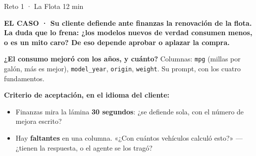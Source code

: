 \documentclass[aspectratio=169, 11pt]{beamer}
\begin{document}
\begin{frame}[shrink=8]{\faTools\hspace{4pt}Reto 1 · La Flota \hfill {\normalsize\color{arcaRed}\faClock\hspace{4pt}12 min}}
  \vspace{-4pt}
  \begin{tcolorbox}[colback=arcaGray, colframe=arcaRed, boxrule=0pt,
    leftrule=3pt, arc=3pt, left=7pt, right=7pt, top=2pt, bottom=2pt]
    {\scriptsize\color{arcaRed}\bfseries EL CASO ·
     \color{textMuted}\mdseries
     Su cliente defiende ante finanzas la \textbf{renovación de la flota}.
     La duda que lo frena: ¿los modelos nuevos de verdad consumen menos, o
     es un mito caro? De eso depende \textbf{aprobar o aplazar} la compra.}
  \end{tcolorbox}
  \vspace{2pt}
  \begin{encargo}
    {\scriptsize\color{textMuted}
     \textbf{¿El consumo mejoró con los años, y cuánto?} Columnas:
     \texttt{mpg} (millas por galón, más es mejor), \texttt{model\_year},
     \texttt{origin}, \texttt{weight}. Su prompt, con los cuatro
     fundamentos.}
  \end{encargo}
  \vspace{2pt}
  {\scriptsize\color{textMuted}
   \textbf{Criterio de aceptación, en el idioma del cliente:}
  \begin{itemize}\setlength{\itemsep}{1pt}
    \item[{\color{arcaRed}\scriptsize\faQuestion}]
      Finanzas mira la lámina \textbf{30 segundos}: ¿se defiende sola, con
      el número de mejora escrito?
    \item[{\color{arcaRed}\scriptsize\faQuestion}]
      Hay \textbf{faltantes} en una columna. «¿Con cuántos vehículos calculó
      esto?» --- ¿tienen la respuesta, o el agente se los tragó?
  \end{itemize}}
\end{frame}
\end{document}
